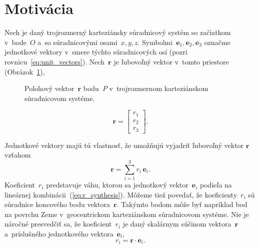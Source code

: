 \documentclass[a4paper, 12pt]{book}
\let\vec\mathbf
\begin{document}
\section{Motivácia}
\label{sec:sh_motivation}

Nech je daný trojrozmerný karteziánsky súradnicový systém so začiatkom 
v~bode~$O$ a~so súradnicovými osami~$x, y, z$.  Symbolmi~$\vec e_1, \vec e_2, 
\vec e_3$ označme jednotkové vektory v~smere týchto súradnicových osí (pozri 
rovnicu~\ref{eq:unit_vectors}).  Nech~$\vec r$ je ľubovoľný vektor v~tomto 
priestore (Obrázok~\ref{fig:unit_vectors}),
%
\begin{figure}
\centering

\caption{Polohový vektor~$\vec r$ bodu~$P$ v~trojrozmernom karteziánskom 
súradnicovom systéme.}
\label{fig:unit_vectors}
\end{figure}

\begin{equation}
\vec r =
\begin{bmatrix}
r_1\\
r_2\\
r_3
\end{bmatrix}
{.}
\end{equation}

Jednotkové vektory majú tú vlastnosť, že umožňujú vyjadriť ľubovoľný vektor
$\vec r$ vzťahom
%
\begin{equation}
\label{eq:r_synthesis}
\vec r = \sum_{i = 1}^3 r_i \, \vec e_i{.}
\end{equation}
%
Koeficient~$r_i$ predstavuje váhu, ktorou sa jednotkový vektor~$\vec e_i$ 
podieľa na lineárnej kombinácii~(\ref{eq:r_synthesis}).  Môžeme tiež povedať, 
že koeficienty~$r_i$ sú súradnice koncového bodu vektora~$\vec r$.  Takýmto 
bodom môže byť napríklad bod na povrchu Zeme v~geocentrickom karteziánskom 
súradnicovom systéme.  Nie je náročné presvedčiť sa, že koeficient~$r_i$ je 
daný skalárnym súčinom vektora~$\vec r$ a~príslušného jednotkového 
vektora~$\vec e_i$,
%
\begin{equation}
\label{eq:r_analysis}
r_i = \vec r \cdot \vec e_i{.}
\end{equation}
\end{document}
